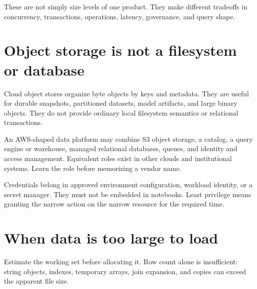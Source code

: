 These are not simply size levels of one product. They make different tradeoffs
in concurrency, transactions, operations, latency, governance, and query shape.

\begin{center}
\end{center}

\section{Object storage is not a filesystem or database}

Cloud object stores organize byte objects by keys and metadata. They are useful
for durable snapshots, partitioned datasets, model artifacts, and large binary
objects. They do not provide ordinary local filesystem semantics or relational
transactions.

An AWS-shaped data platform may combine S3 object storage, a catalog, a query
engine or warehouse, managed relational databases, queues, and identity and
access management. Equivalent roles exist in other clouds and institutional
systems. Learn the role before memorizing a vendor name.

Credentials belong in approved environment configuration, workload identity,
or a secret manager. They must not be embedded in notebooks. Least privilege
means granting the narrow action on the narrow resource for the required time.

\section{When data is too large to load}

Estimate the working set before allocating it. Row count alone is insufficient:
string objects, indexes, temporary arrays, join expansion, and copies can exceed
the apparent file size.

